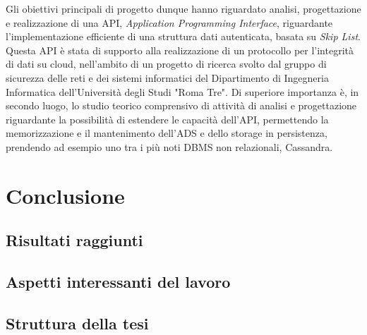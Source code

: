 		Gli obiettivi principali di progetto dunque hanno riguardato analisi, progettazione e realizzazione di una API, \textit{Application Programming Interface}, riguardante l'implementazione efficiente di una struttura dati autenticata, basata su \textit{Skip List}. Questa API è stata di supporto alla realizzazione di un protocollo per l'integrità di dati su cloud, nell'ambito di un progetto di ricerca svolto dal gruppo di sicurezza delle reti e dei sistemi informatici del Dipartimento di Ingegneria Informatica dell'Università degli Studi "Roma Tre". Di superiore importanza è, in secondo luogo, lo studio teorico comprensivo di attività di analisi e progettazione riguardante la possibilità di estendere le capacità dell'API, permettendo la memorizzazione e il mantenimento dell'ADS e dello storage in persistenza, prendendo ad esempio uno tra i più noti DBMS non relazionali, Cassandra.

\section{Conclusione}
	
	\subsection{Risultati raggiunti}
	

		
		
	\subsection{Aspetti interessanti del lavoro}
	
	
	\subsection{Struttura della tesi}
	

